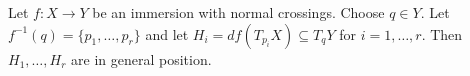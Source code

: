 Let $f: X \to Y$ be an immersion with normal crossings. Choose $q \in Y$. Let $f^{-1}(q) = \{p_1, \ldots, p_r\}$ and let $H_i = df(T_{p_i}X) \subseteq T_qY$ for $i = 1, \ldots, r$. Then $H_1, \ldots, H_r$ are in general position.
